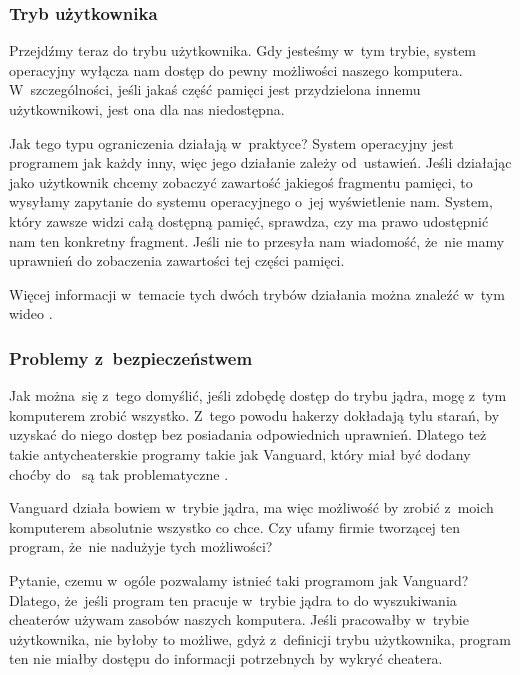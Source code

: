 \documentclass[10pt,t]{beamer}
\begin{document}
\begin{frame}
  \frametitle{Tryb użytkownika}


  Przejdźmy teraz do trybu użytkownika. Gdy jesteśmy w~tym trybie, system
  operacyjny wyłącza nam dostęp do pewny możliwości naszego komputera.
  W~szczególności, jeśli jakaś część pamięci jest przydzielona innemu
  użytkownikowi, jest ona dla nas niedostępna.

  Jak tego typu ograniczenia działają w~praktyce? System operacyjny jest
  programem jak każdy inny, więc jego działanie zależy od~ustawień. Jeśli
  działając jako użytkownik chcemy zobaczyć zawartość jakiegoś fragmentu
  pamięci, to wysyłamy zapytanie do systemu operacyjnego o~jej wyświetlenie
  nam. System, który zawsze widzi całą dostępną pamięć, sprawdza, czy ma
  prawo udostępnić nam ten konkretny fragment. Jeśli nie to przesyła nam
  wiadomość, że~nie mamy uprawnień do zobaczenia zawartości tej części
  pamięci.

  Więcej informacji w~temacie tych dwóch trybów działania można znaleźć
  w~tym wideo
  \parencite{Daves-Garage-Kernel-Mode-vs-User-Mode-Why-it-ETC-Ver-2024}.

\end{frame}





\begin{frame}
  \frametitle{Problemy z~bezpieczeństwem}


  Jak można~się z~tego domyślić, jeśli zdobędę dostęp do trybu jądra, mogę
  z~tym komputerem zrobić wszystko. Z~tego powodu hakerzy dokładają tylu
  starań, by uzyskać do niego dostęp \alert{bez} posiadania odpowiednich
  uprawnień. Dlatego też takie antycheaterskie programy takie jak Vanguard,
  który miał być dodany choćby do
  ~są tak problematyczne
  \parencite{Low-Level-Why-Riots-anti-cheat-is-a-HUGE-problem-Ver-2024}.

  Vanguard działa bowiem w~trybie jądra, ma więc możliwość by zrobić
  z~moich komputerem absolutnie wszystko co chce. Czy ufamy firmie
  tworzącej ten program, że~nie nadużyje tych możliwości?

  Pytanie, czemu w~ogóle pozwalamy istnieć taki programom jak Vanguard?
  Dlatego, że~jeśli program ten pracuje w~trybie jądra to do wyszukiwania
  cheaterów używam zasobów \alert{naszych} komputera. Jeśli pracowałby
  w~trybie użytkownika, nie byłoby to możliwe, gdyż z~definicji trybu
  użytkownika, program ten nie miałby dostępu do informacji potrzebnych by
  wykryć cheatera.

\end{frame}
\end{document}
